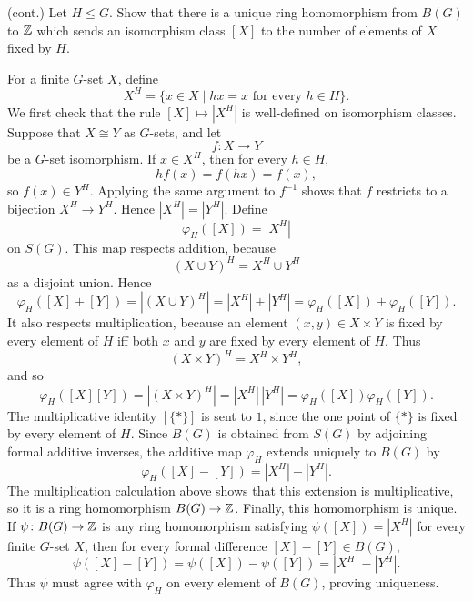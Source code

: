 \documentclass[../Odyssey_Project.tex]{subfiles}
\begin{document}
\begin{exercise}
\label{ex:3.14}
(cont.) Let $H \leq G$. Show that there is a unique ring homomorphism from $B(G)$ to $\mathbb{Z}$ which sends an isomorphism class $[X]$ to the number of elements of $X$ fixed by $H$.
\end{exercise}
\begin{solution}
    For a finite $G$-set $X$, define
    \[
        X^H=\{x\in X\mid hx=x \text{ for every } h\in H\}.
    \]
    We first check that the rule $[X]\mapsto |X^H|$ is well-defined on isomorphism classes. Suppose that $X\cong Y$ as $G$-sets, and let
    \[
        f\colon X\to Y
    \]
    be a $G$-set isomorphism. If $x\in X^H$, then for every $h\in H$,
    \[
        hf(x)=f(hx)=f(x),
    \]
    so $f(x)\in Y^H$. Applying the same argument to $f^{-1}$ shows that $f$ restricts to a bijection $X^H\to Y^H$. Hence $|X^H|=|Y^H|$.
    Define
    \[
        \varphi_H([X])=|X^H|
    \]
    on $S(G)$. This map respects addition, because
    \[
        (X\cup Y)^H=X^H\cup Y^H
    \]
    as a disjoint union. Hence
    \[
        \varphi_H([X]+[Y])
        =
        |(X\cup Y)^H|
        =
        |X^H|+|Y^H|
        =
        \varphi_H([X])+\varphi_H([Y]).
    \]
    It also respects multiplication, because an element $(x,y)\in X\times Y$ is fixed by every element of $H$ iff both $x$ and $y$ are fixed by every element of $H$. Thus
    \[
        (X\times Y)^H=X^H\times Y^H,
    \]
    and so
    \[
        \varphi_H([X][Y])
        =
        |(X\times Y)^H|
        =
        |X^H|\,|Y^H|
        =
        \varphi_H([X])\varphi_H([Y]).
    \]
    The multiplicative identity $[\{*\}]$ is sent to $1$, since the one point of $\{*\}$ is fixed by every element of $H$.
    Since $B(G)$ is obtained from $S(G)$ by adjoining formal additive inverses, the additive map $\varphi_H$ extends uniquely to $B(G)$ by
    \[
        \varphi_H([X]-[Y])=|X^H|-|Y^H|.
    \]
    The multiplication calculation above shows that this extension is multiplicative, so it is a ring homomorphism $B(G)\to \mathbb{Z}$.
    Finally, this homomorphism is unique. If $\psi\colon B(G)\to \mathbb{Z}$ is any ring homomorphism satisfying $\psi([X])=|X^H|$ for every finite $G$-set $X$, then for every formal difference $[X]-[Y]\in B(G)$,
    \[
        \psi([X]-[Y])
        =
        \psi([X])-\psi([Y])
        =
        |X^H|-|Y^H|.
    \]
    Thus $\psi$ must agree with $\varphi_H$ on every element of $B(G)$, proving uniqueness.
\end{solution}
\end{document}
